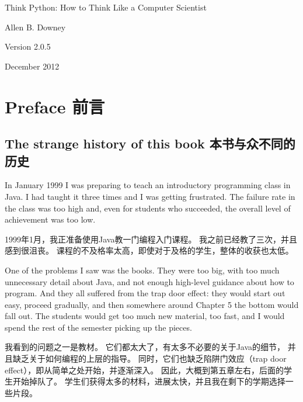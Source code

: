 \documentclass[10pt]{book}
\newcommand{\thetitle}{Think Python: How to Think Like a Computer Scientist}
\newcommand{\theversion}{2.0.5}
\newcommand{\thedate}{December 2012}
\begin{document}
\begin{CJK}{UTF8}{gbsn}
\begin{latexonly}
{\vspace{0.2in}

} %

\end{latexonly}



\begin{htmlonly}


{\Large \thetitle}

{\large Allen B. Downey}

Version \theversion

\thedate

\setcounter{chapter}{-1}

\end{htmlonly}

\fi


\chapter{Preface 前言}

\section*{The strange history of this book 本书与众不同的历史}

In January 1999 I was preparing to teach an introductory programming
class in Java.  I had taught it three times and I was getting
frustrated.  The failure rate in the class was too high and, even for
students who succeeded, the overall level of achievement was too low.

1999年1月，我正准备使用Java教一门编程入门课程。
我之前已经教了三次，并且感到很沮丧。
课程的不及格率太高，即使对于及格的学生，整体的收获也太低。

One of the problems I saw was the books.  
They were too big, with too much unnecessary detail about Java, and
not enough high-level guidance about how to program.  And they all
suffered from the trap door effect: they would start out easy,
proceed gradually, and then somewhere around Chapter 5 the bottom would
fall out.  The students would get too much new material, too fast,
and I would spend the rest of the semester picking up the pieces.

我看到的问题之一是教材。
它们都太大了，有太多不必要的关于Java的细节，
并且缺乏关于如何编程的上层的指导。
同时，它们也缺乏陷阱门效应（trap door effect），即从简单之处开始，并逐渐深入。
因此，大概到第五章左右，后面的学生开始掉队了。
学生们获得太多的材料，进展太快，并且我在剩下的学期选择一些片段。


\end{CJK}
\end{document}
